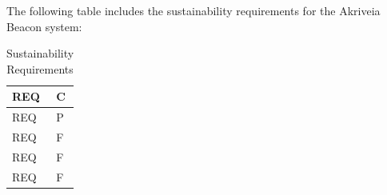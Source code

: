 \break
The following table includes the sustainability requirements for the Akriveia Beacon system:

\bgroup
\def\arraystretch{1.5}
\begin{table}[H]
\centering
\begin{tabular}{ | m{3cm} | m{13cm}| } 
\hline
REQ & C\\ 
\hline
REQ & P\\ 
\hline
REQ & F\\  
\hline
REQ & F\\ 
\hline
REQ & F\\ 
\hline
\end{tabular}
\caption{Sustainability Requirements}
\end{table}	


%